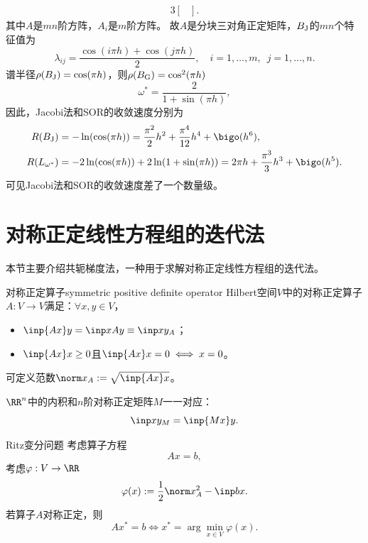 \begin{example}
\begin{alignat*}{3}
\begin{bmatrix}
        \end{bmatrix}.
    \end{alignat*}
    其中$A$是$mn$阶方阵，$A_i$是$m$阶方阵。
    故$A$是分块三对角正定矩阵，$B_\text J$的$mn$个特征值为
    \[
        \lambda_{ij}=\frac{\cos(i\pi h)+\cos(j\pi h)}2,\quad i=1,\ldots,m,\enspace j=1,\ldots,n.
    \]
    谱半径$\rho(B_\text J)=\cos(\pi h)$，则$\rho(B_\text G)=\cos^2(\pi h)$
    \[
        \omega^*=\frac2{1+\sin(\pi h)},
    \]
    因此，Jacobi法和SOR的收敛速度分别为
    \begin{alignat*}{3}
        R(B_\text J)&=-\ln(\cos(\pi h))=\frac{\pi^2}2h^2+\frac{\pi^4}{12}h^4+\bigo(h^6),\\
        R(L_{\omega^*})&=-2\ln(\cos(\pi h))+2\ln(1+\sin(\pi h))=2\pi h+\frac{\pi^3}3h^3+\bigo(h^5).
    \end{alignat*}
    可见Jacobi法和SOR的收敛速度差了一个数量级。
\end{example}

\section{对称正定线性方程组的迭代法}

本节主要介绍共轭梯度法，一种用于求解对称正定线性方程组的迭代法。

\begin{definition}
    {对称正定算子}{symmetric positive definite operator}
    Hilbert空间$V$中的对称正定算子$A:V\to V$满足：$\forall x,y\in V$，
    \begin{itemize}
        \item $\inp{Ax}y=\inp x{Ay}\equiv\inp xy_A$；
        \item $\inp{Ax}x\geq 0$且$\inp{Ax}x=0\iff x=0$。
    \end{itemize}
    可定义范数$\norm x_A:=\sqrt{\inp{Ax}x}$。
\end{definition}

\begin{corollary}
    $\RR^n$中的内积和$n$阶对称正定矩阵$M$一一对应：
    \[
        \inp xy_M=\inp{Mx}y.
    \]
\end{corollary}

\begin{theorem}
    {Ritz变分问题}{}
    考虑算子方程
    \begin{equation}
        Ax=b,
    \end{equation}
    考虑$\varphi:V\to\RR$
    \begin{equation}
        \varphi(x):=\frac12\norm x_A^2-\inp bx.
    \end{equation}
    若算子$A$对称正定，则
    \begin{equation}
        Ax^*=b\iff x^*=\arg\min_{x\in V}\varphi(x).
    \end{equation}
\end{theorem}

